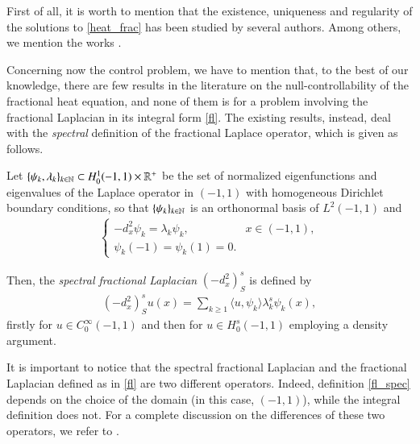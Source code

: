 First of all, it is worth to mention that the existence, uniqueness and regularity of the solutions to \eqref{heat_frac} has been studied by several authors. Among others, we mention the works \cite{biccari2017parabolic,fernandez2016boundary,leonori2015basic}. 

Concerning now the control problem, we have to mention that, to the best of our knowledge, there are few results in the literature on the null-controllability of the fractional heat equation, and none of them is for a problem involving the fractional Laplacian in its integral form \eqref{fl}. The existing results, instead, deal with the \textit{spectral} definition of the fractional Laplace operator, which is given as follows.

Let $\{\psi_k,\lambda_k\}_{k\in\mathbb{N}}\subset H_0^1(-1,1)\times\mathbb{R}^+$ be the set of normalized eigenfunctions and eigenvalues of the Laplace operator in $(-1,1)$ with homogeneous Dirichlet boundary conditions, so that $\{\psi_k\}_{k\in\mathbb{N}}$ is an orthonormal basis of $L^2(-1,1)$ and         
\begin{align*}
	\begin{cases}
		-d_x^2\psi_k =\lambda_k\psi_k, & x\in (-1,1), 
		\\
		\psi_k(-1)=\psi_k(1)=0.
	\end{cases}
\end{align*}

Then, the \textit{spectral fractional Laplacian} $(-d_x^2)^s_S$ is defined by
\begin{align}\label{fl_spec}
	(-d_x^2)^s_S u(x) = \sum_{k\geq 1}\langle u,\psi_k\rangle \lambda_k^s\psi_k(x),
\end{align}
firstly for $u\in C_0^{\infty}(-1,1)$ and then for $u\in H_0^s(-1,1)$ employing a density argument.

It is important to notice that the spectral fractional Laplacian and the fractional Laplacian defined as in \eqref{fl} are two different operators. Indeed, definition \eqref{fl_spec} depends on the choice of the domain (in this case, $(-1,1)$), while the integral definition does not. For a complete discussion on the differences of these two operators, we refer to \cite{servadei2014spectrum}.

